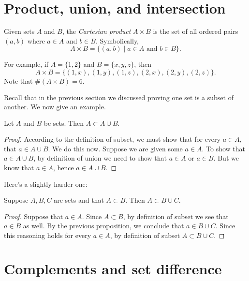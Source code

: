 \documentclass{tufte-book}
\begin{document}
\section{Product, union, and intersection}
\label{sec:prod-union-inters}

\begin{definition}
  Given sets $A$ and $B$, the \emph{Cartesian product} $A \times B$ is the set of all ordered pairs $(a, b)$ where $a \in A$ and $b \in B$. Symbolically,
  \[
  A \times B = \{(a,b) \mid a \in A \text{ and } b \in B\}.
  \]
\end{definition}
For example, if $A = \{1, 2\}$ and $B = \{x, y, z\}$, then
\[
A \times B = \{(1, x), (1, y), (1, z), (2, x), (2, y), (2, z)\}.
\]
Note that $\#(A \times B) = 6$.

Recall that in the previous section we discussed proving one set is a subset of another. We now give an example.
\begin{proposition}
  Let $A$ and $B$ be sets. Then $A \subset A \cup B$.
\end{proposition}

\begin{proof}
  According to the definition of subset, we must show that for every $a \in A$, that $a \in A \cup B$. We do this now. Suppose we are given some $a \in A$. To show that $a \in A \cup B$, by definition of union we need to show that $a \in A$ or $a \in B$. But we know that $a \in A$, hence $a \in A \cup B$.
\end{proof}

Here's a slightly harder one:
\begin{proposition}
  Suppose $A, B, C$ are sets and that $A \subset B$. Then $A \subset B \cup C$.
\end{proposition}

\begin{proof}
  Suppose that $a \in A$. Since $A \subset B$, by definition of subset we see that $a \in B$ as well. By the previous proposition, we conclude that $a \in B \cup C$. Since this reasoning holds for every $a \in A$, by definition of subset $A \subset B \cup C$.
\end{proof}




\section{Complements and set difference}
\label{sec:compl-set-diff}
\end{document}

